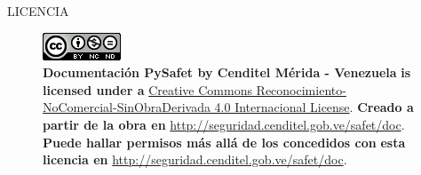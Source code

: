 \documentclass[letterpaper,11pt,spanish]{sphinxmanual}
\begin{document}
\begin{center}LICENCIA
\end{center}\begin{figure}[htbp]
\centering
\capstart

\includegraphics{88x31.png}
\caption{\textbf{Documentación PySafet by Cenditel Mérida - Venezuela}
\textbf{is licensed under a}
\href{http://creativecommons.org/licenses/by-nc-nd/4.0/}{Creative Commons Reconocimiento-NoComercial-SinObraDerivada 4.0 Internacional License}.
\textbf{Creado a partir de la obra en}
\href{http://seguridad.cenditel.gob.ve/safet/doc}{http://seguridad.cenditel.gob.ve/safet/doc}.
\textbf{Puede hallar permisos más allá de los concedidos con}
\textbf{esta licencia en} \href{http://seguridad.cenditel.gob.ve/safet/doc}{http://seguridad.cenditel.gob.ve/safet/doc}.}\end{figure}



\renewcommand{\indexname}{Índice}
\printindex
\end{document}
